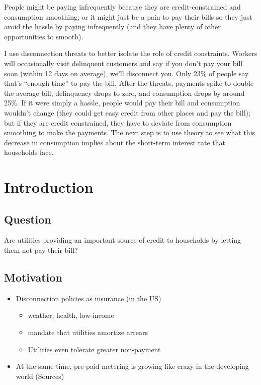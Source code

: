 \documentclass[12pt]{article}
\begin{document}
People might be paying infrequently because they are credit-constrained and consumption smoothing; or it might just be a pain to pay their bills so they just avoid the hassle by paying infrequently (and they have plenty of other opportunities to smooth).  

I use disconnection threats to better isolate the role of credit constraints.  Workers will occasionally visit delinquent customers and say if you don't pay your bill soon (within 12 days on average), we'll disconnect you.  Only 23\% of people say that's ``enough time'' to pay the bill.  After the threats, payments spike to double the average bill, delinquency drops to zero, and consumption drops by around 25\%.  If it were simply a hassle, people would pay their bill and consumption wouldn't change (they could get easy credit from other places and pay the bill); but if they are credit constrained, they have to deviate from consumption smoothing to make the payments.  The next step is to use theory to see what this decrease in consumption implies about the short-term interest rate that households face.


\section{Introduction}


\subsection{Question} 
Are utilities providing an important source of credit to households by letting them not pay their bill?

\subsection{Motivation}
\begin{itemize}
\item Disconnection policies as insurance (in the US) 
	\begin{itemize}
		\item weather, health, low-income
		\item mandate that utilities amortize arrears
		\item Utilities even tolerate greater non-payment
	\end{itemize}
\item At the same time, pre-paid metering is growing like crazy in the developing world (Sources)
\end{itemize}
\end{document}
